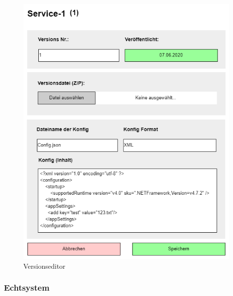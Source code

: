 \begin{center}
    \begin{figure}[H]
        \centering
        \includegraphics[scale=0.4]{content/attachments/k-ver-view.png}
        \caption{Versionseditor}
        \label{fig:k_ver_list}
    \end{figure}
\end{center}

\newpage

\subsubsection{Echtsystem}
\label{app:view_real}


